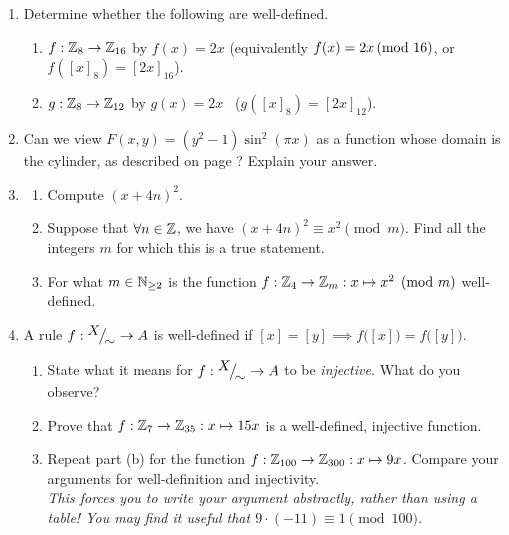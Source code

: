\begin{exercises}{}{}
\begin{enumerate}
		
				
	\item Determine whether the following are well-defined.
	\begin{enumerate}
		\item $f:\mathbb{Z}_8\to\mathbb{Z}_{16}$ by $f(x)=2x$ \hfill (equivalently $f(x)=2x\negthickspace\pmod{16}$, or $f([x]_8)=[2x]_{16}$).
		\item $g:\mathbb{Z}_8\to\mathbb{Z}_{12}$ by $g(x)=2x$ \ ($g([x]_8)=[2x]_{12}$).
	\end{enumerate}
		
	\item Can we view $F(x,y)=(y^2-1)\sin^2(\pi x)$ as a function whose domain is the cylinder, as described on page \pageref{subsec:cylinder}? Explain your answer. 

	\item\begin{enumerate}
	  	\item Compute $(x+4n)^2$.
	  	\item Suppose that $\forall n\in\mathbb{Z}$, we have $(x+4n)^2\equiv x^2\pmod m$. Find all the integers $m$ for which this is a true statement.
	  	\item For what $m\in\mathbb{N}_{\ge 2}$ is the function $f:\mathbb{Z}_4\to\mathbb{Z}_m:x\mapsto x^2\pmod m$ well-defined.
		\end{enumerate}
		
	\item A rule $f:{}^{\textstyle {X}}\!\big/_{\textstyle \!{\sim}}\to A$ is well-defined if $[x]=[y]\implies f\bigl([x]\bigr)=f\bigl([y]\bigr)$.
	\begin{enumerate}
	  \item State what it means for $f:{}^{\textstyle {X}}\!\big/_{\textstyle \!{\sim}}\to A$ to be \emph{injective.} What do you observe?
	  \item Prove that $f:\mathbb{Z}_7\to\mathbb{Z}_{35}:x\mapsto 15x$ is a well-defined, injective function.
	  \item Repeat part (b) for the function $f:\mathbb{Z}_{100}\to\mathbb{Z}_{300}:x\mapsto 9x$. Compare your arguments for well-definition and injectivity.\\
	  \emph{This forces you to write your argument abstractly, rather than using a table! You may find it useful that $9\cdot(-11)\equiv 1\pmod{100}$.}
	\end{enumerate}
		

\end{enumerate}
\end{exercises}
